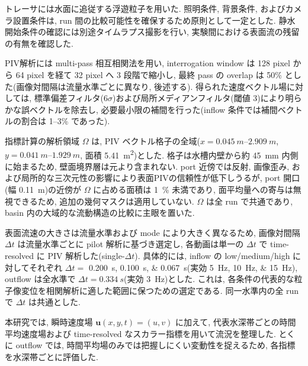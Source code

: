 トレーサには水面に追従する浮遊粒子を用いた. 照明条件, 背景条件, およびカメラ設置条件は, run 間の比較可能性を確保するため原則として一定とした. 静水開始条件の確認には別途タイムラプス撮影を行い, 実験間における表面流の残留の有無を確認した.

PIV解析には multi-pass 相互相関法を用い, interrogation window は 128 pixel から 64 pixel を経て 32 pixel へ 3 段階で縮小し, 最終 pass の overlap は 50\% とした(画像対間隔は流量水準ごとに異なり, 後述する). 得られた速度ベクトル場に対しては, 標準偏差フィルタ($6\sigma$)および局所メディアンフィルタ(閾値 3)により明らかな誤ベクトルを除去し, 必要最小限の補間を行った(inflow 条件では補間ベクトルの割合は 1--3\% であった).

指標計算の解析領域 $\Omega$ は, PIV ベクトル格子の全域($x = \SIrange{0.045}{2.909}{m}$, $y = \SIrange{0.041}{1.929}{m}$, 面積 \SI{5.41}{m^2})とした. 格子は水槽内壁から約 \SI{45}{mm} 内側に始まるため, 壁面境界層は元より含まれない. port 近傍では反射, 画像歪み, および局所的な三次元性の影響により表面PIVの信頼性が低下しうるが, port 開口(幅 \SI{0.11}{m})の近傍が $\Omega$ に占める面積は \SI{1}{\percent} 未満であり, 面平均量への寄与は無視できるため, 追加の幾何マスクは適用していない. $\Omega$ は全 run で共通であり, basin 内の大域的な流動構造の比較に主眼を置いた.

表面流速の大きさは流量水準および mode により大きく異なるため, 画像対間隔 $\Delta t$ は流量水準ごとに pilot 解析に基づき選定し, 各動画は単一の $\Delta t$ で time-resolved に PIV 解析した(single-$\Delta t$). 具体的には, inflow の low/medium/high に対してそれぞれ $\Delta t = $ \SIlist{0.200;0.100;0.067}{s}(実効 \SIlist{5;10;15}{Hz}), outflow は全水準で $\Delta t = \SI{0.334}{s}$(実効 \SI{3}{Hz})とした. これは, 各条件の代表的な粒子像変位を相関解析に適した範囲に保つための選定である. 同一水準内の全 run で $\Delta t$ は共通とした.

本研究では, 瞬時速度場 $\mathbf{u}(x,y,t)=(u,v)$ に加えて, 代表水深帯ごとの時間平均速度場および time-resolved なスカラー指標を用いて流況を整理した. とくに outflow では, 時間平均場のみでは把握しにくい変動性を捉えるため, 各指標を水深帯ごとに評価した.

